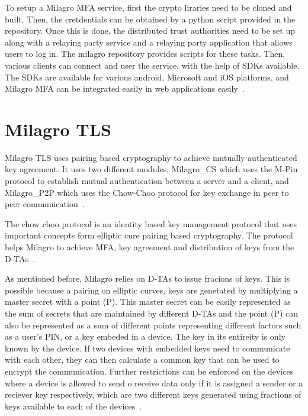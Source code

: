 To setup a Milagro MFA service, first the crypto liraries need to be
cloned and built. Then, the cretdentials can be obtained by a python
script provided in the repository.  Once this is done, the distributed
trust authorities need to be set up along with a relaying party
service and a relaying party application that allows users to log
in. The milagro repository provides scripts for these tasks. Then,
various clients can connect and user the service, with the help of
SDKs available. The SDKs are available for various android, Microsoft
and iOS platforms, and Milagro MFA can be integrated easily in web
applications easily~\cite{mfa-install}.


\section{Milagro TLS}

Milagro TLS uses pairing based cryptography to achieve mutually
authenticated key agreement. It uses two different modules,
Milagro\_CS which uses the M-Pin protocol to establish mutual
authentication between a server and a client, and Milagro\_P2P which
uses the Chow-Choo protocol for key exchange in peer to peer
communication~\cite{mtls-white-paper}.


The chow choo protocol is an identity based key management protocol
that uses important concepts form elliptic cure pairing based
cryptography. The protocol helps Milagro to achieve MFA, key agreement
and distribution of keys from the D-TAs~\cite{milagro-protocols}.


As mentioned before, Milagro relies on D-TAs to issue fracions of
keys. This is possible because a pairing on elliptic curves, keys are
genetated by multiplying a master secret with a point (P). This master
secret can be easily represented as the sum of secrets that are
maintained by different D-TAs and the point (P) can also be
represented as a sum of different points representing different
factors such as a user's PIN, or a key embeded in a device. The key in
its entireity is only known by the device. If two devices with
embedded keys need to communicate with each other, they can then
calculate a common key that can be used to encrypt the
communication. Further restrictions can be enforced on the devices
where a device is allowed to send o receive data only if it is
assigned a sender or a reciever key respectively, which are two
different keys generated using fractions of keys available to each of
the devices~\cite{milagro-protocols}.

